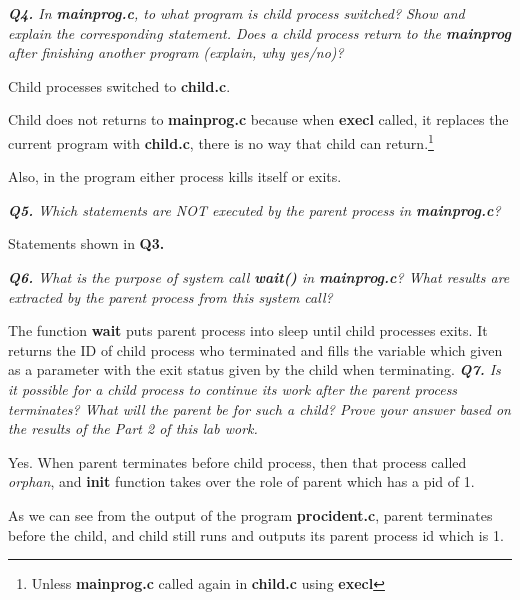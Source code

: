 \documentclass[11pt]{article}
\begin{document}
\vspace{5mm}
\textit{\textbf{Q4.} In \textbf{mainprog.c}, to what program is child process switched? Show and explain the corresponding statement. Does a child process return to the \textbf{mainprog} after finishing another program (explain, why yes/no)?}
\vspace{5mm}

Child processes switched to \textbf{child.c}.

Child does not returns to \textbf{mainprog.c} because when \textbf{execl} called, it replaces the current program with \textbf{child.c}, there is no way that child can return.\footnote{Unless \textbf{mainprog.c} called again in \textbf{child.c} using \textbf{execl}}

Also, in the program either process kills itself or exits.

\vspace{5mm}
\textit{\textbf{Q5.} Which statements are NOT executed by the parent process in \textbf{mainprog.c}?}
\vspace{5mm}

Statements shown in \textbf{Q3.}

\vspace{5mm}
\textit{\textbf{Q6.} What is the purpose of system call \textbf{wait()} in \textbf{mainprog.c}? What results are extracted by the parent process from this system call?}
\vspace{5mm}

The function \textbf{wait} puts parent process into sleep until child processes exits. It returns the ID of child process who terminated and fills the variable which given as a parameter with the exit status given by the child when terminating.
\newpage
\vspace{5mm}
\textit{\textbf{Q7.} Is it possible for a child process to continue its work after the parent process terminates? What will the parent be for such a child? Prove your answer based on the results of the Part 2 of this lab work.}
\vspace{5mm}

Yes. When parent terminates before child process, then that process called \textit{orphan}, and \textbf{init} function takes over the role of parent which has a pid of 1.

As we can see from the output of the program \textbf{procident.c}, parent terminates before the child, and child still runs and outputs its parent process id which is 1.
\end{document}
